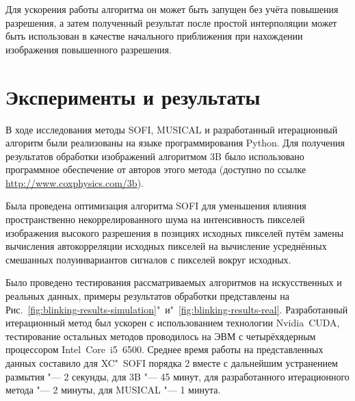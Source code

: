 Для ускорения работы алгоритма он может быть запущен без учёта повышения разрешения, а затем полученный результат после простой интерполяции может быть использован в качестве начального приближения при нахождении изображения повышенного разрешения.

\section{Эксперименты и результаты}

В ходе исследования методы SOFI, MUSICAL и разработанный итерационный алгоритм были реализованы на языке программирования Python. Для получения результатов обработки изображений алгоритмом 3B было использовано программное обеспечение от авторов этого метода (доступно по ссылке \url{http://www.coxphysics.com/3b}).

Была проведена оптимизация алгоритма SOFI для уменьшения влияния пространственно некоррелированного шума на интенсивность пикселей изображения высокого разрешения в позициях исходных пикселей путём замены вычисления автокорреляции исходных пикселей на вычисление усреднённых смешанных полуинвариантов сигналов с пикселей вокруг исходных.

Было проведено тестирования рассматриваемых алгоритмов на искусственных и реальных данных, примеры результатов обработки представлены на Рис.~\ref{fig:blinking-results-simulation}"~и"~\ref{fig:blinking-results-real}. Разработанный итерационный метод был ускорен с использованием технологии Nvidia~CUDA, тестирование остальных методов проводилось на ЭВМ с четырёхядерным процессором Intel~Core~i5~6500. Среднее время работы на представленных данных составило для XC"~SOFI порядка 2 вместе с дальнейшим устранением размытия "--- 2 секунды, для 3B "--- 45 минут, для разработанного итерационного метода "--- 2 минуты, для MUSICAL "--- 1 минута. %

